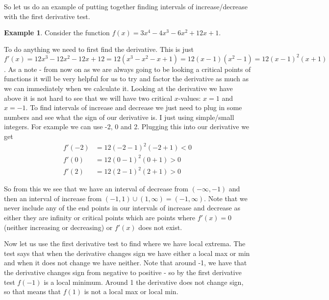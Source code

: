 \documentclass[12pt,reqno]{article}
\theoremstyle{definition}
\newtheorem*{Example}{Example}
\begin{document}
So let us do an example of putting together finding intervals of increase/decrease with the first derivative test. 

\begin{Example}
	Consider the function $f(x) = 3x^4 - 4x^3 - 6x^2 + 12 x + 1$. 
	
	To do anything we need to first find the derivative. This is just $f'(x) = 12x^3 - 12x^2 - 12x + 12 = 12(x^3 - x^2 - x + 1) = 12(x - 1)(x^2 - 1) = 12(x - 1)^2 (x + 1)$. 
	As a note - from now on as we are always going to be looking a critical points of functions it will be very helpful for us to try and factor the derivative as much as we can immediately when we calculate it. Looking at the derivative we have above it is not hard to see that we will have two critical $x$-values: $x = 1$ and $x = -1$.
	To find intervals of increase and decrease we just need to plug in some numbers and see what the sign of our derivative is. I just using simple/small integers. For example we can use -2, 0 and 2. Plugging this into our derivative we get 
	\begin{align*}
		f'(-2) &= 12(-2 -1)^2 (-2+1) < 0 \\
		f'(0) &= 12(0 - 1)^2 (0 + 1) > 0 \\
		f'(2) &= 12(2 - 1)^2 (2 + 1) > 0
	\end{align*}
	
	So from this we see that we have an interval of decrease from $(-\infty, -1)$ and then an interval of increase from $(-1, 1)\cup (1, \infty) = (-1, \infty)$. Note that we never include any of the end points in our intervals of increase and decrease as either they are infinity or critical points which are points where $f'(x) = 0$ (neither increasing or decreasing) or $f'(x)$ does not exist.

	Now let us use the first derivative test to find where we have local extrema. The test says that when the derivative changes sign we have either a local max or min and when it does not change we have neither. Note that around -1, we have that the derivative changes sign from negative to positive - so by the first derivative test $f(-1)$ is a local minimum. Around 1 the derivative does not change sign, so that means that $f(1)$ is not a local max or local min.
\end{Example} 	
\end{document}
